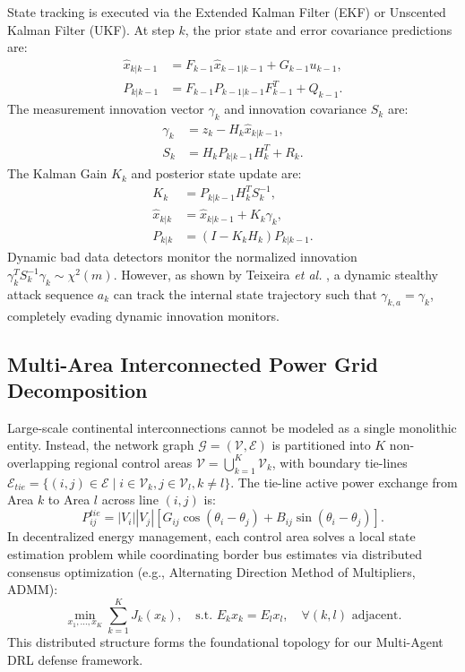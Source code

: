 \documentclass[journal,compsoc]{IEEEtran}
\begin{document}
State tracking is executed via the Extended Kalman Filter (EKF) or Unscented Kalman Filter (UKF). At step $k$, the prior state and error covariance predictions are:
\begin{align}
    \hat{x}_{k|k-1} &= F_{k-1} \hat{x}_{k-1|k-1} + G_{k-1} u_{k-1}, \\
    P_{k|k-1} &= F_{k-1} P_{k-1|k-1} F_{k-1}^T + Q_{k-1}.
\end{align}
The measurement innovation vector $\gamma_k$ and innovation covariance $S_k$ are:
\begin{align}
    \gamma_k &= z_k - H_k \hat{x}_{k|k-1}, \\
    S_k &= H_k P_{k|k-1} H_k^T + R_k.
\end{align}
The Kalman Gain $K_k$ and posterior state update are:
\begin{align}
    K_k &= P_{k|k-1} H_k^T S_k^{-1}, \\
    \hat{x}_{k|k} &= \hat{x}_{k|k-1} + K_k \gamma_k, \\
    P_{k|k} &= (I - K_k H_k) P_{k|k-1}.
\end{align}
Dynamic bad data detectors monitor the normalized innovation $\gamma_k^T S_k^{-1} \gamma_k \sim \chi^2(m)$. However, as shown by Teixeira \textit{et al.} \cite{ref19}, a dynamic stealthy attack sequence $a_k$ can track the internal state trajectory such that $\gamma_{k,a} = \gamma_k$, completely evading dynamic innovation monitors.

\subsection{Multi-Area Interconnected Power Grid Decomposition}
Large-scale continental interconnections cannot be modeled as a single monolithic entity. Instead, the network graph $\mathcal{G} = (\mathcal{V}, \mathcal{E})$ is partitioned into $K$ non-overlapping regional control areas $\mathcal{V} = \bigcup_{k=1}^K \mathcal{V}_k$, with boundary tie-lines $\mathcal{E}_{tie} = \{(i, j) \in \mathcal{E} \mid i \in \mathcal{V}_k, j \in \mathcal{V}_l, k \ne l\}$. The tie-line active power exchange from Area $k$ to Area $l$ across line $(i, j)$ is:
\begin{equation}
    P_{ij}^{tie} = |V_i| |V_j| \left[ G_{ij} \cos(\theta_i - \theta_j) + B_{ij} \sin(\theta_i - \theta_j) \right].
\end{equation}
In decentralized energy management, each control area solves a local state estimation problem while coordinating border bus estimates via distributed consensus optimization (e.g., Alternating Direction Method of Multipliers, ADMM):
\begin{equation}
    \min_{x_1, \dots, x_K} \sum_{k=1}^K J_k(x_k), \quad \text{s.t. } E_k x_k = E_l x_l, \quad \forall (k, l) \text{ adjacent}.
\end{equation}
This distributed structure forms the foundational topology for our Multi-Agent DRL defense framework.
\end{document}

